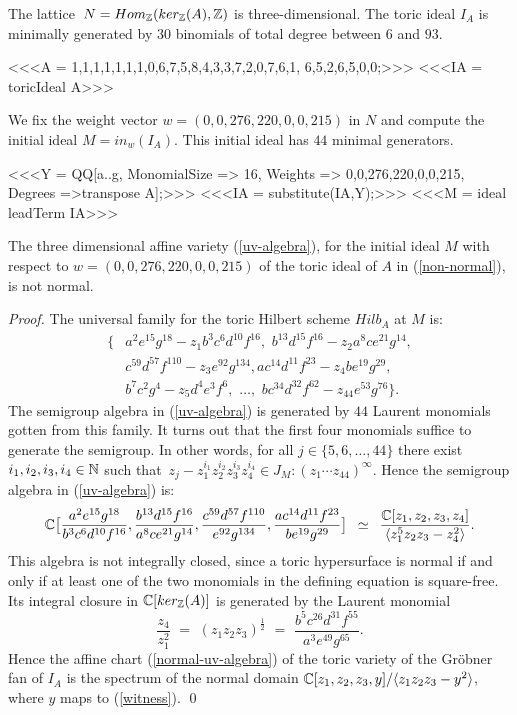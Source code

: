 The lattice $\,N =  Hom_{\mathbb{Z}} ( ker_{\mathbb{Z}}(A), \mathbb{Z})$
is three-dimensional. The toric ideal $I_A$ is minimally 
generated by $30$ binomials of total degree between $6$ and $93$.

<<<A = {{1,1,1,1,1,1,1},{0,6,7,5,8,4,3},{3,7,2,0,7,6,1},
   {6,5,2,6,5,0,0}};>>>
<<<IA = toricIdeal A>>>

We fix the weight vector $w = (0,0,276,220,0,0,215)$ in $N$ and 
compute the initial ideal $M = in_w(I_A)$. This initial ideal 
has $44$ minimal generators.

<<<Y = QQ[a..g, MonomialSize => 16,
           Weights => {0,0,276,220,0,0,215},
           Degrees =>transpose A];>>>
<<<IA = substitute(IA,Y);>>>
<<<M = ideal leadTerm IA>>>

\begin{proposition} The three dimensional affine variety
  (\ref{uv-algebra}), for the initial ideal $M$ with respect to $w =
  (0,0,276,220,0,0,215)$ of the toric ideal of $A$ in
  (\ref{non-normal}), is not normal.
\end{proposition} 

\begin{proof}
The universal family for the toric Hilbert scheme $Hilb_A$ at $M$ is:
\begin{eqnarray*}
\{& a^2e^{15}g^{18}-z_1b^3c^6d^{10}f^{16}, \,\,
b^{13}d^{15}f^{16}-z_2a^8ce^{21}g^{14}, \\ &
c^{59} d^{57} f^{110} - z_3  e^{92} g^{134},
a c^{14} d^{11} f^{23} - z_4  b e^{19} g^{29}, \\ &
b^7 c^2 g^4 - z_5  d^4 e^3 f^6, \,\,
\ldots, \,\,
b c^{34} d^{32} f^{62} - z_{44}  e^{53} g^{76} \}.
\end{eqnarray*}
The semigroup algebra in (\ref{uv-algebra})
is generated by $44$ Laurent  monomials 
gotten from this family. It turns out that the
first four monomials suffice to generate the semigroup.
In other words, for all $j \in \{5,6,\ldots,44\}$
there exist
$ i_1,i_2,i_3, i_4 \in \mathbb{N} $ such that
$\,
z_{j} - 
z_1^{i_1}
z_2^{i_2}
z_3^{i_3}
z_4^{i_4} \in  J_M : (z_1 \cdots z_{44})^\infty $.
Hence the semigroup algebra in (\ref{uv-algebra}) is:
$$ \mathbb{C} \bigl[
 \frac{a^2 e^{15} g^{18}}{ b^3 c^6 d^{10} f^{16}}, 
 \frac{ b^{13} d^{15} f^{16} }{a^8 c e^{21} g^{14}},
 \frac{ c^{59} d^{57} f^{110}} {e^{92} g^{134}}, 
 \frac{ a c^{14} d^{11} f^{23}} {b e^{19} g^{29}}
\bigr] \,\,\, \simeq \,\,\,
\frac{\mathbb{C}[z_1,z_2,z_3,z_4]}{\langle z_1^5  z_2 z_3 - z_4^2 \rangle}.
$$
This algebra is not integrally closed, since
a toric hypersurface is normal if and only if
at least one of the two monomials in the defining equation 
is square-free. Its integral closure 
in $\mathbb{C}[ ker_{\mathbb{Z}}(A) ]$ is generated by the
Laurent monomial
\begin{equation}
\label{witness}
\frac{z_4}{z_1^2} \,\, = \,\, 
( z_1 z_2 z_3)^{\frac{1}{2}}  \,\, = \,\, 
\frac{ b^5 c^{26} d^{31} f^{55}}{a^3 e^{49} g^{65}}.
\end{equation}
Hence the affine chart (\ref{normal-uv-algebra}) of the toric variety
of the Gr\"obner fan of $I_A$ is the spectrum of the normal domain
$  \mathbb{C}[z_1,z_2,z_3,y]/ \langle
z_1  z_2 z_3 - y^2 \rangle$, 
where $y$ maps to (\ref{witness}).
\qed
\end{proof}

